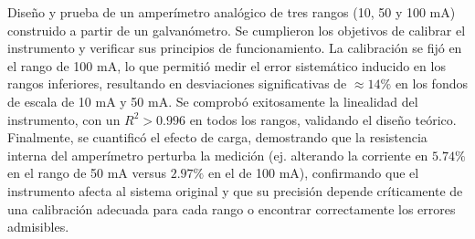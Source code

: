 Diseño y prueba de un amperímetro analógico de tres rangos (10, 50 y 100 mA) construido a partir de un galvanómetro. Se cumplieron los objetivos de calibrar el instrumento y verificar sus principios de funcionamiento. La calibración se fijó en el rango de 100 mA, lo que permitió medir el error sistemático inducido en los rangos inferiores, resultando en desviaciones significativas de $\approx 14\%$ en los fondos de escala de 10 mA y 50 mA. Se comprobó exitosamente la linealidad del instrumento, con un $R^2 > 0.996$ en todos los rangos, validando el diseño teórico. Finalmente, se cuantificó el efecto de carga, demostrando que la resistencia interna del amperímetro perturba la medición (ej. alterando la corriente en $5.74\%$ en el rango de 50 mA versus $2.97\%$ en el de 100 mA), confirmando que el instrumento afecta al sistema original y que su precisión depende críticamente de una calibración adecuada para cada rango o encontrar correctamente los errores admisibles.